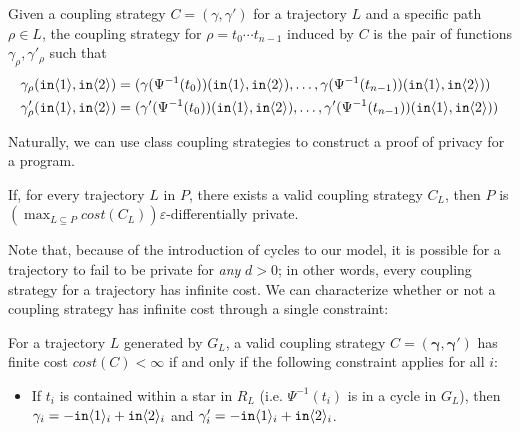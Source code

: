 \begin{defn}\label{svInducedCouplingStrategy}
    Given a coupling strategy $C = (\gamma, \gamma')$ for a trajectory $L$ and a specific path $\rho\in L$, the coupling strategy for $\rho=t_0\cdots t_{n-1}$ induced by $C$ is the pair of functions $\gamma_\rho, \gamma'_\rho$ such that 
    \begin{align*}
        \gamma_\rho(\texttt{in}\langle1 \rangle, \texttt{in}\langle2 \rangle) &= (\gamma(\Psi^{-1}(t_0))(\texttt{in}\langle1 \rangle, \texttt{in}\langle2 \rangle), \ldots,\gamma(\Psi^{-1}(t_{n-1}))(\texttt{in}\langle1 \rangle, \texttt{in}\langle2 \rangle) )\\
        \gamma'_\rho(\texttt{in}\langle1 \rangle, \texttt{in}\langle2 \rangle) &= (\gamma'(\Psi^{-1}(t_0))(\texttt{in}\langle1 \rangle, \texttt{in}\langle2 \rangle),\ldots,\gamma'(\Psi^{-1}(t_{n-1}))(\texttt{in}\langle1 \rangle, \texttt{in}\langle2 \rangle) )
    \end{align*}
\end{defn}

Naturally, we can use class coupling strategies to construct a proof of privacy for a program.

\begin{lemma}
    If, for every trajectory $L$ in $P$, there exists a valid coupling strategy $C_L$, then $P$ is $(\max_{L\subseteq P} cost(C_L))\varepsilon$-differentially private. 
\end{lemma}


Note that, because of the introduction of cycles to our model, it is possible for a trajectory to fail to be private for \textit{any} $d>0$; in other words, every coupling strategy for a trajectory has infinite cost. We can characterize whether or not a coupling strategy has infinite cost through a single constraint:

\begin{lemma}\label{finiteCostConstraintLemma}
    For a trajectory $L$ generated by $G_L$, a valid coupling strategy $C = (\mathbf{\gamma}, \mathbf{\gamma}')$ has finite cost $cost(C)<\infty$ if and only if the following constraint applies for all $i$:
    \begin{itemize}
        \item If $t_i$ is contained within a star in $R_L$ (i.e. $\Psi^{-1}(t_i)$ is in a cycle in $G_L$), then $\gamma_i = -\texttt{in}\langle1 \rangle_i+\texttt{in}\langle2 \rangle_i$ and $\gamma_i' = -\texttt{in}\langle1 \rangle_i+\texttt{in}\langle2 \rangle_i$.
    \end{itemize}
\end{lemma}

